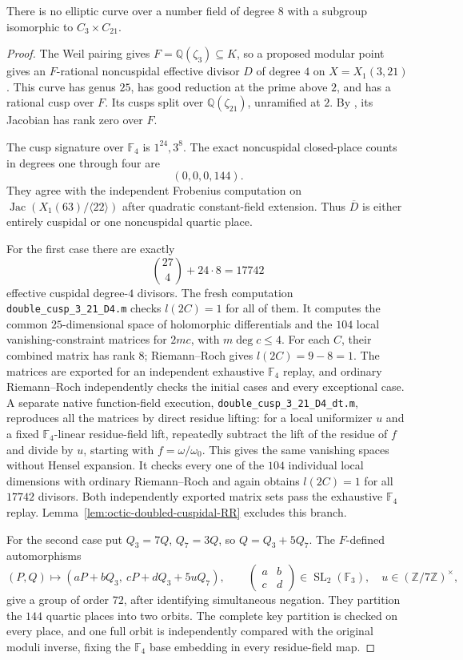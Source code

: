 \begin{proposition}\label{prop:octic-no321}
There is no elliptic curve over a number field of degree $8$
with a subgroup isomorphic to $C_3\times C_{21}$.
\end{proposition}
\begin{proof}
The Weil pairing gives $F=\mathbb Q(\zeta_3)\subseteq K$,
so a proposed modular point gives an $F$-rational
noncuspidal effective divisor $D$ of degree $4$ on
$X=X_1(3,21)$. This curve has genus $25$, has good reduction
at the prime above $2$, and has a rational cusp over $F$.
Its cusps split over $\mathbb Q(\zeta_{21})$, unramified at $2$.
By \cite[Theorem~4.1]{DS}, its Jacobian has rank zero over $F$.

The cusp signature over $\mathbb F_4$ is $1^{24},3^8$.
The exact noncuspidal closed-place counts in degrees one
through four are
\[
 (0,0,0,144).
\]
They agree with the independent Frobenius computation on
$\operatorname{Jac}(X_1(63)/\langle22\rangle)$ after quadratic
constant-field extension. Thus $\overline D$ is either
entirely cuspidal or one noncuspidal quartic place.

For the first case there are exactly
\[
 \binom{27}{4}+24\cdot8=17742
\]
effective cuspidal degree-$4$ divisors.
The fresh computation \texttt{double\_cusp\_3\_21\_D4.m}
checks $l(2C)=1$ for all of them. It computes the common
$25$-dimensional space of holomorphic differentials and
the $104$ local vanishing-constraint matrices for
$2m c$, with $m\deg c\leq4$.
For each $C$, their combined matrix has rank $8$;
Riemann--Roch gives $l(2C)=9-8=1$.
The matrices are exported for an independent exhaustive
$\mathbb F_4$ replay, and ordinary Riemann--Roch independently
checks the initial cases and every exceptional case.
A separate native function-field execution,
\texttt{double\_cusp\_3\_21\_D4\_dt.m}, reproduces all the
matrices by direct residue lifting: for a local uniformizer $u$
and a fixed $\mathbb F_4$-linear residue-field lift, repeatedly
subtract the lift of the residue of $f$ and divide by $u$,
starting with $f=\omega/\omega_0$.
This gives the same vanishing spaces without Hensel expansion.
It checks every one of the $104$ individual local dimensions
with ordinary Riemann--Roch and again obtains $l(2C)=1$
for all $17742$ divisors. Both independently exported matrix
sets pass the exhaustive $\mathbb F_4$ replay.
Lemma~\ref{lem:octic-doubled-cuspidal-RR} excludes this branch.

For the second case put $Q_3=7Q$, $Q_7=3Q$, so
$Q=Q_3+5Q_7$. The $F$-defined automorphisms
\[
 (P,Q)\longmapsto
 (aP+bQ_3,\ cP+dQ_3+5uQ_7),
 \qquad
 \begin{pmatrix}a&b\\c&d\end{pmatrix}\in\operatorname{SL}_2(\mathbb F_3),
 \quad u\in(\mathbb Z/7\mathbb Z)^\times,
\]
give a group of order $72$, after identifying simultaneous
negation. They partition the $144$ quartic places into
two orbits. The complete key partition is checked on every
place, and one full orbit is independently compared with
the original moduli inverse, fixing the $\mathbb F_4$ base
embedding in every residue-field map.


\end{proof}
